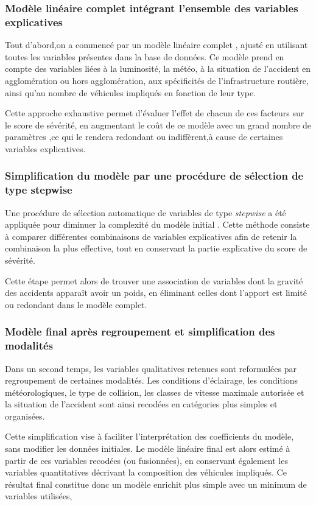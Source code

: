 \documentclass[11pt,a4paper]{article}
\begin{document}
\subsubsection{Modèle linéaire complet intégrant l’ensemble des variables explicatives}

Tout d'abord,on a commencé par un modèle linéaire complet , ajusté en utilisant toutes les variables présentes dans la base de données. Ce modèle prend en compte des variables liées à la luminosité, la météo, à la situation de l'accident en agglomération ou hors agglomération, aux spécificités de l'infrastructure routière, ainsi qu'au nombre de véhicules impliqués en fonction de leur type.


Cette approche exhaustive permet d'évaluer l'effet de chacun de ces facteurs sur le score de sévérité, en augmentant le coût de ce modèle avec un grand nombre de paramètres ,ce qui le rendera redondant ou indiffèrent,à cause de  certaines variables explicatives.


\subsubsection{Simplification du modèle par une procédure de sélection de type stepwise}

Une procédure de sélection
automatique de variables de type \textit{stepwise} a été appliquée pour diminuer la complexité du modèle initial . Cette méthode consiste à comparer
différentes combinaisons de variables explicatives afin de retenir la combinaison la plus effective,
tout en conservant la partie explicative du score de sévérité.

Cette étape permet
alors de trouver une association de variables dont la gravité des accidents apparaît avoir un poids, en éliminant celles dont l’apport est limité ou redondant dans le modèle complet.

\subsubsection{Modèle final après regroupement et simplification des modalités}

Dans un second temps, les variables qualitatives retenues sont reformulées par regroupement de
certaines modalités. Les conditions d’éclairage, les conditions météorologiques, le type de collision,
les classes de vitesse maximale autorisée et la situation de l’accident sont ainsi recodées en catégories
plus simples et organisées. 

Cette simplification vise à faciliter l’interprétation des coefficients du modèle,
sans modifier les données initiales. Le modèle linéaire final est alors estimé à partir
de ces variables recodées (ou fusionnées), en conservant également les variables quantitatives décrivant la composition
des véhicules impliqués. Ce résultat final constitue donc un modèle enrichit plus simple avec un minimum de variables utilisées,
\end{document}
